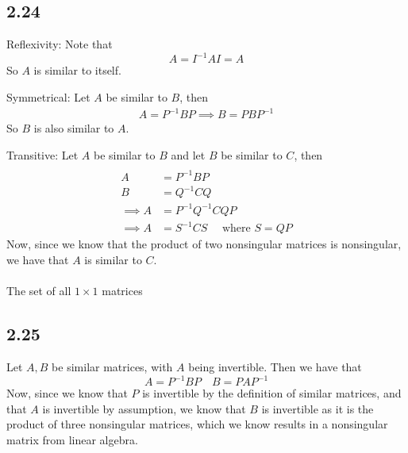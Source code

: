 \documentclass[letterpaper,12pt]{article}
\theoremstyle{definition}
\begin{document}
\subsection*{2.24}
Reflexivity:
Note that
\[A = I^{-1}AI = A \]
So $A$ is similar to itself.

Symmetrical:
Let $A$ be similar to $B$, then
\begin{align*}
    A = P^{-1}BP
    \implies B = PBP^{-1}
\end{align*}
So $B$ is also similar to $A$.

Transitive:
Let $A$ be similar to $B$ and let $B$ be similar to $C$, then 
\begin{align*}
\\A &= P^{-1}BP
\\B &= Q^{-1}CQ
\\\implies A &= P^{-1}Q^{-1}CQP
\\\implies A &= S^{-1}CS \quad \text{ where $S = QP$} 
\end{align*}
Now, since we know that the product of two nonsingular matrices is nonsingular, we have that $A$ is similar to $C$.
\\
\\
The set of all $1 \times 1$ matrices

\subsection*{2.25}
Let $A,B$ be similar matrices, with $A$ being invertible. Then we have that 
\[ A = P^{-1}BP \quad B = PAP^{-1}\]
Now, since we know that $P$ is invertible by the definition of similar matrices, and that $A$ is invertible by assumption, we know that $B$ is invertible as it is the product of three nonsingular matrices, which we know results in a nonsingular matrix from linear algebra.
\end{document}

